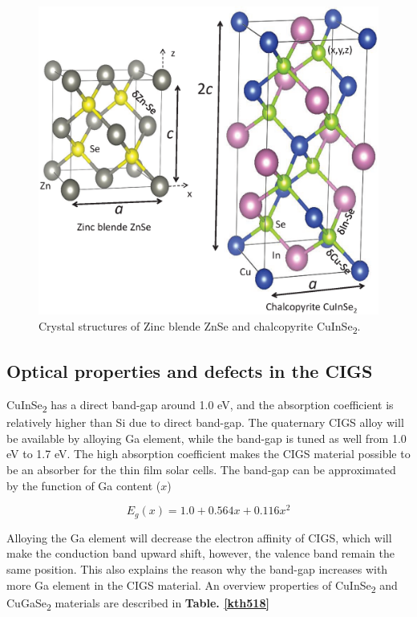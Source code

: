 \documentclass[a4paper, 12pt, titlepage,oneside,drop]{kthesis}
\begin{document}
\begin{figure}[H]
\centering
\includegraphics[scale=0.4]{structureciise.eps} 
\caption{Crystal structures of Zinc blende ZnSe and chalcopyrite CuInSe\textsubscript{2}.}
\label{crystal_cigs}
\end{figure}






\subsection{Optical properties and defects in the CIGS}
CuInSe\textsubscript{2} has a direct band-gap around 1.0 eV, and the absorption coefficient is relatively higher than Si due to direct band-gap. The quaternary CIGS alloy will be available by alloying Ga element, while the band-gap is tuned as well from 
1.0 eV to 1.7 eV. The high absorption coefficient makes the CIGS material possible to be an absorber for the thin film solar cells. The band-gap can be approximated by the function of Ga content ($x$)

\begin{equation}
E_g(x) = 1.0 + 0.564x+0.116x^2
\end{equation}

Alloying the Ga element will decrease the electron affinity of CIGS, which will make the conduction band upward shift, however, the valence band remain the same position. This also explains the reason why the band-gap increases with 
more Ga element in the CIGS material. An overview properties of CuInSe\textsubscript{2} and CuGaSe\textsubscript{2} materials are described in \textbf{Table. \ref{kth518}} 
\end{document}
